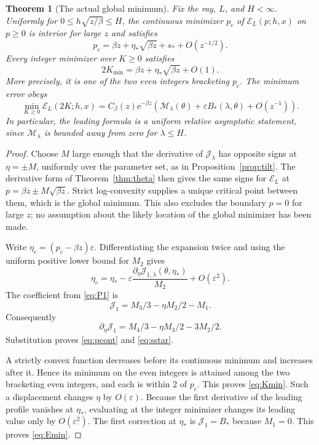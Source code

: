 \documentclass[11pt,a4paper]{article}
\numberwithin{equation}{section}
\newtheorem{theorem}{Theorem}[section]
\theoremstyle{definition}\newtheorem{definition}[theorem]{Definition}
\theoremstyle{remark}\newtheorem{remark}[theorem]{Remark}
\newcommand{\e}{\mathrm e}
\newcommand{\eps}{\varepsilon}
\newcommand{\calE}{\mathcal E}
\newcommand{\calJ}{\mathcal J}
\newcommand{\calM}{\mathcal M}
\begin{document}
\begin{theorem}[The actual global minimum]
\label{thm:optimal}
Fix the ray, $L$, and $H<\infty$. Uniformly for
$0\le h\sqrt{z/\beta}\le H$, the continuous minimizer $p_c$ of
$\calE_L(p;h,x)$ on $p\ge0$ is interior for large $z$ and satisfies
\begin{equation}
 p_c=\beta z+\eta_*\sqrt{\beta z}+s_*+O(z^{-1/2}).
 \label{eq:pcont}
\end{equation}
Every integer minimizer over $K\ge0$ satisfies
\begin{equation}
 2K_{\min}=\beta z+\eta_*\sqrt{\beta z}+O(1).
 \label{eq:Kmin}
\end{equation}
More precisely, it is one of the two even integers bracketing $p_c$.
The minimum error obeys
\begin{equation}
 \min_{K\ge0}\calE_L(2K;h,x)
 =C_\beta(z)\e^{-\beta z}
 \left(\calM_\lambda(\theta)+\eps B_*(\lambda,\theta)
              +O(z^{-1})\right).
 \label{eq:Emin}
\end{equation}
In particular, the leading formula is a uniform relative asymptotic
statement, since $\calM_\lambda$ is bounded away from zero for
$\lambda\le H$.
\end{theorem}
\begin{proof}
Choose $M$ large enough that the derivative of $\calJ_\lambda$ has
opposite signs at $\eta=\pm M$, uniformly over the parameter set, as in
Proposition~\ref{prop:tilt}. The derivative form of Theorem~\ref{thm:theta}
then gives the same signs for $\calE_L$ at
$p=\beta z\pm M\sqrt{\beta z}$. Strict log-convexity supplies a unique
critical point between them, which is the global minimum. This also
excludes the boundary $p=0$ for large $z$; no assumption about the likely
location of the global minimizer has been made.

Write $\eta_c=(p_c-\beta z)\eps$. Differentiating the expansion twice and
using the uniform positive lower bound for $M_2$ gives
\[
 \eta_c=\eta_*-
 \eps\frac{\partial_\eta\calJ_{1,\lambda}(\theta,\eta_*)}{M_2}
 +O(\eps^2).
\]
The coefficient from \eqref{eq:P1} is
\[
 \calJ_1=M_3/3-\eta M_2/2-M_1.
\]
Consequently
\[
 \partial_\eta\calJ_1=M_4/3-\eta M_3/2-3M_2/2.
\]
Substitution proves \eqref{eq:pcont} and \eqref{eq:sstar}.

A strictly convex function decreases before its continuous minimum and
increases after it. Hence its minimum on the even integers is attained
among the two bracketing even integers, and each is within $2$ of $p_c$.
This proves \eqref{eq:Kmin}. Such a displacement changes $\eta$ by
$O(\eps)$. Because the first derivative of the leading profile vanishes
at $\eta_*$, evaluating at the integer minimizer changes its leading value
only by $O(\eps^2)$. The first correction at $\eta_*$ is
$\calJ_1=B_*$ because $M_1=0$. This proves \eqref{eq:Emin}.
\end{proof}
\end{document}
